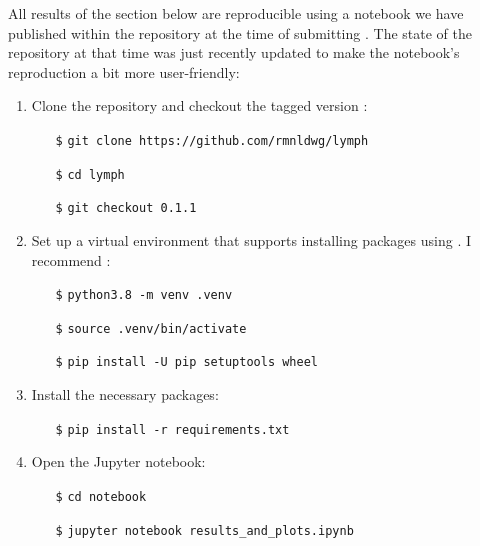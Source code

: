 \begin{tcolorbox}[
    title=\faIcon{recycle} Reproducibility,
    parbox=false,
    float
]
    All results of the section below are reproducible using a notebook we have published within the  repository at the time of submitting \cite{ludwig_hidden_2021}. The state of the repository at that time was just recently updated to make the notebook's reproduction a bit more user-friendly:

    \begin{enumerate}
        \item Clone the  repository and checkout the tagged version :
        \begin{itemize}[leftmargin=10mm]
            \setlength\itemsep{-0.5em}
            \item[\texttt{\$}] \verb|git clone https://github.com/rmnldwg/lymph|
            \item[\texttt{\$}] \verb|cd lymph|
            \item[\texttt{\$}] \verb|git checkout 0.1.1|
        \end{itemize}

        \item Set up a virtual environment that supports installing packages using . I recommend :
        \begin{itemize}[leftmargin=10mm]
            \setlength\itemsep{-0.5em}
            \item[\texttt{\$}] \verb|python3.8 -m venv .venv|
            \item[\texttt{\$}] \verb|source .venv/bin/activate|
            \item[\texttt{\$}] \verb|pip install -U pip setuptools wheel|
        \end{itemize}

        \item Install the necessary packages:
        \begin{itemize}[leftmargin=10mm]
            \setlength\itemsep{-0.5em}
            \item[\texttt{\$}] \verb|pip install -r requirements.txt|
        \end{itemize}

        \item Open the Jupyter notebook:
        \begin{itemize}[leftmargin=10mm]
            \setlength\itemsep{-0.5em}
            \item[\texttt{\$}] \verb|cd notebook|
            \item[\texttt{\$}] \verb|jupyter notebook results_and_plots.ipynb|
        \end{itemize}
    \end{enumerate}


\end{tcolorbox}
